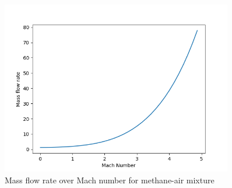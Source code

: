\documentclass[a4paper,11pt]{article}
\begin{document}
	\begin{figure}[H]
		\centering
		\includegraphics[width=0.9\textwidth]{metan_pow(1mol)/Mass_flow_rate_over_Mach.png}
       		\caption{Mass flow rate over Mach number for methane-air mixture}
	\end{figure}
\end{document}
